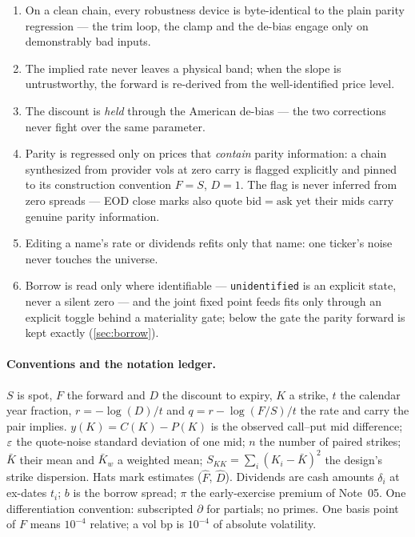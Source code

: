 \documentclass[11pt]{article}
\begin{document}
\begin{invariant}
\begin{enumerate}[leftmargin=1.6em]
\item On a clean chain, every robustness device is byte-identical to the
plain parity regression --- the trim loop, the clamp and the de-bias
engage only on demonstrably bad inputs.
\item The implied rate never leaves a physical band; when the slope is
untrustworthy, the forward is re-derived from the well-identified price
level.
\item The discount is \emph{held} through the American de-bias --- the two
corrections never fight over the same parameter.
\item Parity is regressed only on prices that \emph{contain} parity
information: a chain synthesized from provider vols at zero carry is
flagged explicitly and pinned to its construction convention $F=S$,
$D=1$.  The flag is never inferred from zero spreads --- EOD close marks
also quote $\mathrm{bid}=\mathrm{ask}$ yet their mids carry genuine parity
information.
\item Editing a name's rate or dividends refits only that name: one
ticker's noise never touches the universe.
\item Borrow is read only where identifiable --- \texttt{unidentified} is
an explicit state, never a silent zero --- and the joint fixed point feeds
fits only through an explicit toggle behind a materiality gate; below the
gate the parity forward is kept exactly (\cref{sec:borrow}).
\end{enumerate}
\end{invariant}

\paragraph{Conventions and the notation ledger.}
$S$ is spot, $F$ the forward and $D$ the discount to expiry, $K$ a strike,
$t$ the calendar year fraction, $r=-\log(D)/t$ and $q=r-\log(F/S)/t$ the
rate and carry the pair implies.  $y(K)=C(K)-P(K)$ is the observed
call--put mid difference; $\varepsilon$ the quote-noise standard deviation of one
mid; $n$ the number of paired strikes; $\bar K$ their mean and
$\bar K_w$ a weighted mean; $S_{KK}=\sum_i(K_i-\bar K)^2$ the design's
strike dispersion.  Hats mark estimates ($\hat F$, $\hat D$).  Dividends
are cash amounts $\delta_i$ at ex-dates $t_i$; $b$ is the borrow spread;
$\pi$ the early-exercise premium of Note~05.  One differentiation
convention: subscripted $\partial$ for partials; no primes.  One basis
point of $F$ means $10^{-4}$ relative; a vol bp is $10^{-4}$ of absolute
volatility.
\end{document}
